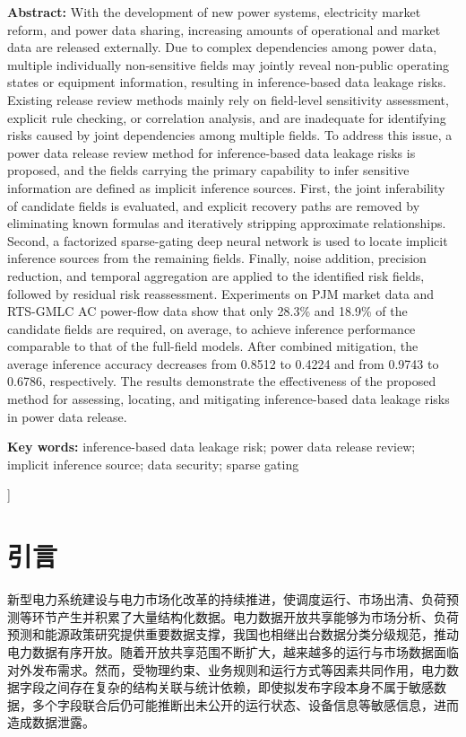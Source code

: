 \documentclass[UTF8,zihao=5,twoside,fontset=none]{ctexart}
\begin{document}
\noindent\textbf{Abstract:} With the development of new power systems, electricity market reform, and power data sharing, increasing amounts of operational and market data are released externally. Due to complex dependencies among power data, multiple individually non-sensitive fields may jointly reveal non-public operating states or equipment information, resulting in inference-based data leakage risks. Existing release review methods mainly rely on field-level sensitivity assessment, explicit rule checking, or correlation analysis, and are inadequate for identifying risks caused by joint dependencies among multiple fields. To address this issue, a power data release review method for inference-based data leakage risks is proposed, and the fields carrying the primary capability to infer sensitive information are defined as implicit inference sources. First, the joint inferability of candidate fields is evaluated, and explicit recovery paths are removed by eliminating known formulas and iteratively stripping approximate relationships. Second, a factorized sparse-gating deep neural network is used to locate implicit inference sources from the remaining fields. Finally, noise addition, precision reduction, and temporal aggregation are applied to the identified risk fields, followed by residual risk reassessment. Experiments on PJM market data and RTS-GMLC AC power-flow data show that only 28.3\% and 18.9\% of the candidate fields are required, on average, to achieve inference performance comparable to that of the full-field models. After combined mitigation, the average inference accuracy decreases from 0.8512 to 0.4224 and from 0.9743 to 0.6786, respectively. The results demonstrate the effectiveness of the proposed method for assessing, locating, and mitigating inference-based data leakage risks in power data release.\par
\noindent\textbf{Key words:} inference-based data leakage risk; power data release review; implicit inference source; data security; sparse gating\par\vspace{0.8em}
]

\section{引言}

新型电力系统建设与电力市场化改革的持续推进，使调度运行、市场出清、负荷预测等环节产生并积累了大量结构化数据\cite{ref-liu-cps}。电力数据开放共享能够为市场分析、负荷预测和能源政策研究提供重要数据支撑\cite{ref-zhu-sharing}，我国也相继出台数据分类分级规范，推动电力数据有序开放\cite{ref-gbt-classify}。随着开放共享范围不断扩大，越来越多的运行与市场数据面临对外发布需求。然而，受物理约束、业务规则和运行方式等因素共同作用，电力数据字段之间存在复杂的结构关联与统计依赖，即使拟发布字段本身不属于敏感数据，多个字段联合后仍可能推断出未公开的运行状态、设备信息等敏感信息，进而造成数据泄露。
\end{document}
